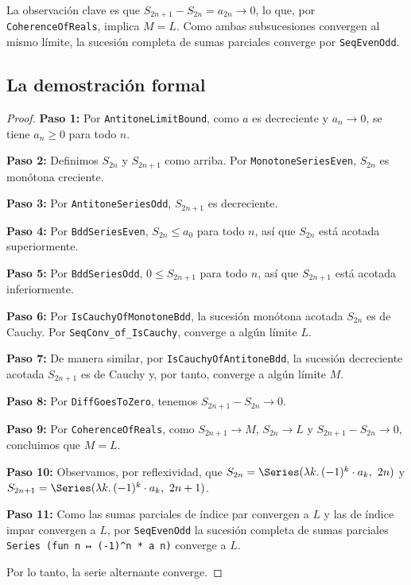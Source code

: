 La observación clave es que $S_{2n+1} - S_{2n} = a_{2n} \to 0$, lo que, por \texttt{CoherenceOfReals}, implica $M = L$. Como ambas subsucesiones convergen al mismo límite, la sucesión completa de sumas parciales converge por \texttt{SeqEvenOdd}.

\subsection{La demostración formal}

\begin{proof}
\textbf{Paso 1:} Por \texttt{AntitoneLimitBound}, como $a$ es decreciente y $a_n \to 0$, se tiene $a_n \ge 0$ para todo $n$.

\textbf{Paso 2:} Definimos $S_{2n}$ y $S_{2n+1}$ como arriba. Por \texttt{MonotoneSeriesEven}, $S_{2n}$ es monótona creciente.

\textbf{Paso 3:} Por \texttt{AntitoneSeriesOdd}, $S_{2n+1}$ es decreciente.

\textbf{Paso 4:} Por \texttt{BddSeriesEven}, $S_{2n} \le a_0$ para todo $n$, así que $S_{2n}$ está acotada superiormente.

\textbf{Paso 5:} Por \texttt{BddSeriesOdd}, $0 \le S_{2n+1}$ para todo $n$, así que $S_{2n+1}$ está acotada inferiormente.

\textbf{Paso 6:} Por \texttt{IsCauchyOfMonotoneBdd}, la sucesión monótona acotada $S_{2n}$ es de Cauchy. Por \texttt{SeqConv\_of\_IsCauchy}, converge a algún límite $L$.

\textbf{Paso 7:} De manera similar, por \texttt{IsCauchyOfAntitoneBdd}, la sucesión decreciente acotada $S_{2n+1}$ es de Cauchy y, por tanto, converge a algún límite $M$.

\textbf{Paso 8:} Por \texttt{DiffGoesToZero}, tenemos $S_{2n+1} - S_{2n} \to 0$.

\textbf{Paso 9:} Por \texttt{CoherenceOfReals}, como $S_{2n+1} \to M$, $S_{2n} \to L$ y $S_{2n+1} - S_{2n} \to 0$, concluimos que $M = L$.

\textbf{Paso 10:} Observamos, por reflexividad, que $S_{2n} = \Series(\lambda k.\,(-1)^k \cdot a_k,\ 2n)$ y $S_{2n+1} = \Series(\lambda k.\,(-1)^k \cdot a_k,\ 2n+1)$.

\textbf{Paso 11:} Como las sumas parciales de índice par convergen a $L$ y las de índice impar convergen a $L$, por \texttt{SeqEvenOdd} la sucesión completa de sumas parciales \texttt{Series (fun n ↦ (-1)\textasciicircum n * a n)} converge a $L$.

Por lo tanto, la serie alternante converge.
\end{proof}

